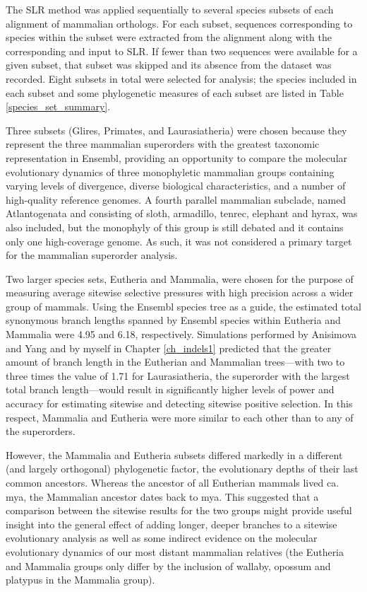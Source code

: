 The SLR method was applied sequentially to several species subsets of
each alignment of mammalian orthologs. For each subset, sequences
corresponding to species within the subset were extracted from the
alignment along with the corresponding \subtr and input to SLR. If
fewer than two sequences were available for a given subset, that
subset was skipped and its absence from the dataset was
recorded. Eight subsets in total were selected for analysis; the
species included in each subset and some phylogenetic measures of each
subset are listed in Table \ref{species_set_summary}.

Three subsets (Glires, Primates, and Laurasiatheria) were chosen
because they represent the three mammalian superorders with the
greatest taxonomic representation in Ensembl, providing an opportunity
to compare the molecular evolutionary dynamics of three monophyletic
mammalian groups containing varying levels of divergence, diverse
biological characteristics, and a number of high-quality reference
genomes. A fourth parallel mammalian subclade, named Atlantogenata and
consisting of sloth, armadillo, tenrec, elephant and hyrax, was also
included, but the monophyly of this group is still debated
\citep{Murphy2007,Churakov2009} and it contains only one high-coverage
genome. As such, it was not considered a primary target for the
mammalian superorder analysis.

Two larger species sets, Eutheria and Mammalia, were chosen for the
purpose of measuring average sitewise selective pressures with high
precision across a wider group of mammals. Using the Ensembl species
tree as a guide, the estimated total synonymous branch lengths spanned
by Ensembl species within Eutheria and Mammalia were 4.95 and 6.18,
respectively. Simulations performed by Anisimova and Yang
\citeyearpar{todo, Anisimova Yang 2002} and by myself in Chapter
\ref{ch_indels1} predicted that the greater amount of branch length in the
Eutherian and Mammalian trees---with two to three times the value of
1.71 for Laurasiatheria, the superorder with the largest total branch
length---would result in significantly higher levels of power and
accuracy for estimating sitewise \omg and detecting sitewise positive
selection. In this respect, Mammalia and Eutheria were more similar to
each other than to any of the superorders.

However, the Mammalia and Eutheria subsets differed markedly in a
different (and largely orthogonal) phylogenetic factor, the
evolutionary depths of their last common ancestors. Whereas the
ancestor of all Eutherian mammals lived ca.  mya, the
Mammalian ancestor dates back to  mya. This suggested that a
comparison between the sitewise results for the two groups might
provide useful insight into the general effect of adding longer,
deeper branches to a sitewise evolutionary analysis as well as some
indirect evidence on the molecular evolutionary dynamics of our most
distant mammalian relatives (the Eutheria and Mammalia groups only
differ by the inclusion of wallaby, opossum and platypus in the
Mammalia group).

